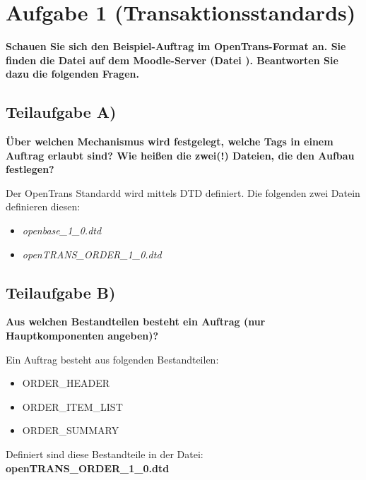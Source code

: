 \section{Aufgabe 1 (Transaktionsstandards)}
\textbf{Schauen Sie sich den Beispiel-Auftrag im OpenTrans-Format an. Sie finden die Datei auf
dem Moodle-Server (Datei ). Beantworten
Sie dazu die folgenden Fragen.}

\subsection{Teilaufgabe A)}
\textbf{Über welchen Mechanismus wird festgelegt, welche Tags in einem Auftrag erlaubt sind?
Wie heißen die zwei(!) Dateien, die den Aufbau festlegen?}

Der OpenTrans Standardd wird mittels DTD definiert. 
Die folgenden zwei Datein definieren diesen:
\begin{itemize}
  \item \textit{openbase\_1\_0.dtd}
  \item \textit{openTRANS\_ORDER\_1\_0.dtd}
\end{itemize}

\subsection{Teilaufgabe B)}
\textbf{Aus welchen Bestandteilen besteht ein Auftrag (nur Hauptkomponenten angeben)?}

Ein Auftrag besteht aus folgenden Bestandteilen:
\begin{itemize}
  \item ORDER\_HEADER
  \item ORDER\_ITEM\_LIST
  \item ORDER\_SUMMARY
\end{itemize}

Definiert sind diese Bestandteile in der Datei:
\textbf{openTRANS\_ORDER\_1\_0.dtd}
\clearpage 
